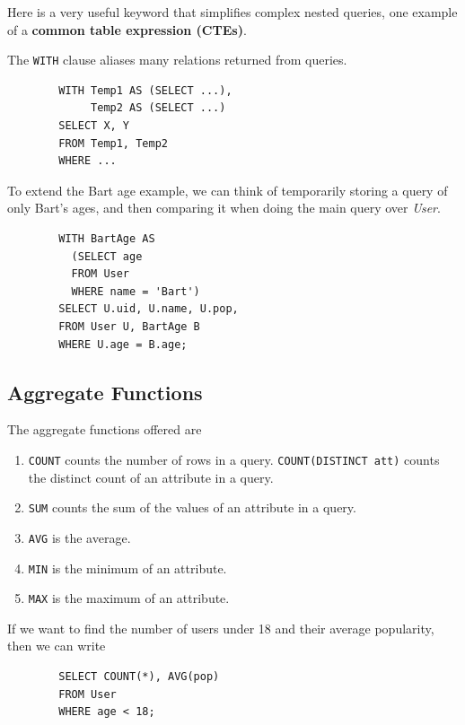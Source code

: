 \documentclass{article}
\begin{document}
    Here is a very useful keyword that simplifies complex nested queries, one example of a \textbf{common table expression (CTEs)}. 
    
    \begin{definition}
      The \texttt{WITH} clause aliases many relations returned from queries. 
      \begin{lstlisting}
        WITH Temp1 AS (SELECT ...), 
             Temp2 AS (SELECT ...) 
        SELECT X, Y 
        FROM Temp1, Temp2 
        WHERE ...
      \end{lstlisting}
    \end{definition}

    \begin{example}
      To extend the Bart age example, we can think of temporarily storing a query of only Bart's ages, and then comparing it when doing the main query over \textit{User}. 
      \begin{lstlisting}
        WITH BartAge AS 
          (SELECT age 
          FROM User 
          WHERE name = 'Bart') 
        SELECT U.uid, U.name, U.pop, 
        FROM User U, BartAge B 
        WHERE U.age = B.age; 
      \end{lstlisting}
    \end{example}

  \subsection{Aggregate Functions} 

    \begin{definition}
      The aggregate functions offered are 
      \begin{enumerate}
        \item \texttt{COUNT} counts the number of rows in a query. \texttt{COUNT(DISTINCT att)} counts the distinct count of an attribute in a query. 
        \item \texttt{SUM} counts the sum of the values of an attribute in a query. 
        \item \texttt{AVG} is the average. 
        \item \texttt{MIN} is the minimum of an attribute. 
        \item \texttt{MAX} is the maximum of an attribute. 
      \end{enumerate}
    \end{definition}

    \begin{example}
      If we want to find the number of users under 18 and their average popularity, then we can write 
      \begin{lstlisting}
        SELECT COUNT(*), AVG(pop) 
        FROM User 
        WHERE age < 18; 
      \end{lstlisting}
    \end{example}
\end{document}
